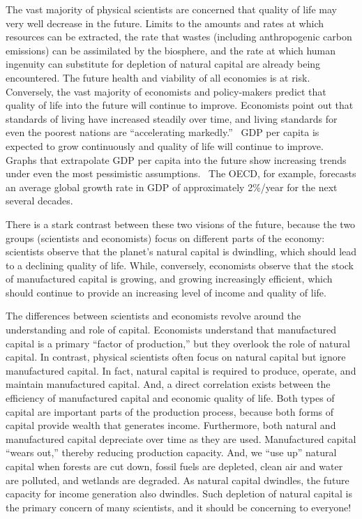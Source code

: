 
The vast majority of physical scientists are concerned that 
quality of life may very well decrease in the future. 
Limits to the amounts and rates at which resources can be extracted, 
the rate that wastes (including anthropogenic carbon emissions) 
can be assimilated by the biosphere, and
the rate at which human ingenuity can substitute 
for depletion of natural capital are already being encountered. 
The future health and viability of all economies is at risk.\cite{IPCC2013} 
Conversely, the vast majority of economists and policy-makers predict 
that quality of life into the future will continue to improve. 
Economists point out that standards of living have increased steadily over time,
and living standards for even the poorest nations 
are ``accelerating markedly.''~\cite{Malik:2013aa} 
GDP per capita is expected to
grow continuously and quality of life will continue to improve. 
Graphs that extrapolate GDP per capita into the future show increasing
trends under even the most pessimistic assumptions.~\cite[p. 170]{Malik:2013aa} 
The OECD, for example, forecasts an average global
growth rate in GDP of approximately 2\%/year 
for the next several decades.\cite[Table A.1]{OECD2012}

There is a stark contrast between these two visions of the future, 
because the two groups (scientists and economists) focus on 
different parts of the economy: 
scientists observe that the planet's natural capital is dwindling, 
which should lead to a declining quality of life.
While, conversely, economists observe that the stock of manufactured capital is growing, 
and growing increasingly efficient, which
should continue to provide an increasing level of income and quality of life. 

The differences between scientists and economists revolve around 
the understanding and role of capital.
Economists understand that manufactured capital is a primary ``factor of production,'' 
but they overlook the role of natural capital. 
In contrast, physical scientists often focus on natural capital but ignore manufactured capital. 
In fact, natural capital is required to produce, operate, and maintain manufactured capital. 
And, a direct correlation exists between the efficiency of manufactured capital
and economic quality of life. 
Both types of capital are important parts of the production process, 
because both forms of capital provide wealth that generates income. 
Furthermore, both natural and manufactured capital depreciate over time as they are used.
Manufactured capital ``wears out,'' thereby reducing production capacity. 
And, we ``use up'' natural capital when forests are cut
down, fossil fuels are depleted, clean air and water are polluted, 
and wetlands are degraded. 
As natural capital dwindles, the future
capacity for income generation also dwindles. 
Such depletion of natural capital is the primary concern of many scientists, 
and it should be concerning to everyone!

